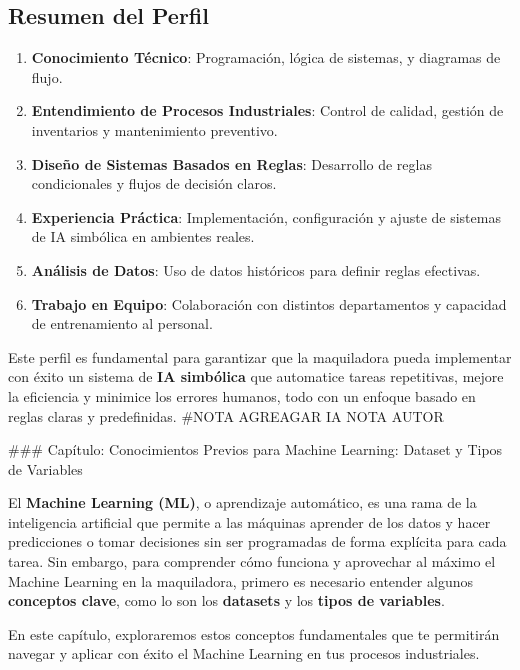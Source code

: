 \documentclass[
  10pt,
  letterpaper,
]{book}
\providecommand{\tightlist}{%
  \setlength{\itemsep}{0pt}\setlength{\parskip}{0pt}}\usepackage{longtable,booktabs,array}
\begin{document}
\subsection{\texorpdfstring{\textbf{Resumen del
Perfil}}{Resumen del Perfil}}\label{resumen-del-perfil}

\begin{enumerate}
\def\labelenumi{\arabic{enumi}.}
\tightlist
\item
  \textbf{Conocimiento Técnico}: Programación, lógica de sistemas, y
  diagramas de flujo.
\item
  \textbf{Entendimiento de Procesos Industriales}: Control de calidad,
  gestión de inventarios y mantenimiento preventivo.
\item
  \textbf{Diseño de Sistemas Basados en Reglas}: Desarrollo de reglas
  condicionales y flujos de decisión claros.
\item
  \textbf{Experiencia Práctica}: Implementación, configuración y ajuste
  de sistemas de IA simbólica en ambientes reales.
\item
  \textbf{Análisis de Datos}: Uso de datos históricos para definir
  reglas efectivas.
\item
  \textbf{Trabajo en Equipo}: Colaboración con distintos departamentos y
  capacidad de entrenamiento al personal.
\end{enumerate}

Este perfil es fundamental para garantizar que la maquiladora pueda
implementar con éxito un sistema de \textbf{IA simbólica} que automatice
tareas repetitivas, mejore la eficiencia y minimice los errores humanos,
todo con un enfoque basado en reglas claras y predefinidas. \#NOTA
AGREAGAR IA NOTA AUTOR

\#\#\# Capítulo: Conocimientos Previos para Machine Learning: Dataset y
Tipos de Variables

El \textbf{Machine Learning (ML)}, o aprendizaje automático, es una rama
de la inteligencia artificial que permite a las máquinas aprender de los
datos y hacer predicciones o tomar decisiones sin ser programadas de
forma explícita para cada tarea. Sin embargo, para comprender cómo
funciona y aprovechar al máximo el Machine Learning en la maquiladora,
primero es necesario entender algunos \textbf{conceptos clave}, como lo
son los \textbf{datasets} y los \textbf{tipos de variables}.

En este capítulo, exploraremos estos conceptos fundamentales que te
permitirán navegar y aplicar con éxito el Machine Learning en tus
procesos industriales.
\end{document}

